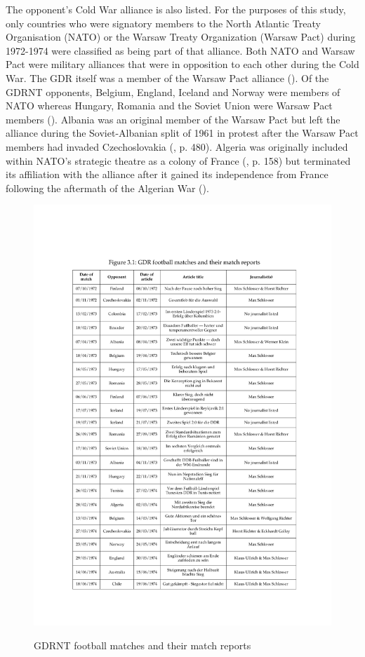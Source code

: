 The opponent’s Cold War alliance is also listed. For the purposes of this study, only countries who were signatory members to the North Atlantic Treaty Organisation (NATO) or the Warsaw Treaty Organization (Warsaw Pact) during 1972-1974 were classified as being part of that alliance. Both NATO and Warsaw Pact were military alliances that were in opposition to each other during the Cold War. The GDR itself was a member of the Warsaw Pact alliance (\cite{wagner2012}). Of the GDRNT opponents, Belgium, England, Iceland and Norway were members of NATO whereas Hungary, Romania and the Soviet Union were Warsaw Pact members (\cite{wagner2012}). Albania was an original member of the Warsaw Pact but left the alliance during the Soviet-Albanian split of 1961 in protest after the Warsaw Pact members had invaded Czechoslovakia (\cite{lüthi2007}, p. 480). Algeria was originally included within NATO’s strategic theatre as a colony of France (\cite{thomas2000}, p. 158) but terminated its affiliation with the alliance after it gained its independence from France following the aftermath of the Algerian War (\cite{connelly2002}).

\newpage
\begin{figure}[t]
\caption{GDRNT football matches and their match reports}
\includegraphics[width=\textwidth]{mres/images/figure 3.1.pdf}
\centering
\label{fig:fig3.1}
\end{figure}

